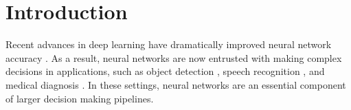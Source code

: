 \section{Introduction}
\label{sec:nn-calibration:introduction}

Recent advances in deep learning have dramatically improved neural network accuracy \citep{simonyan2014very, srivastava2015highway, he2015deep, huang2016deep, huang2016densely}.
As a result, neural networks are now entrusted with making complex decisions in applications, such as object detection \cite{girshick2015fast}, speech recognition \cite{hannun2014deep}, and medical diagnosis \cite{caruana2015intelligible}.
In these settings, neural networks are an essential component of larger decision making pipelines.


